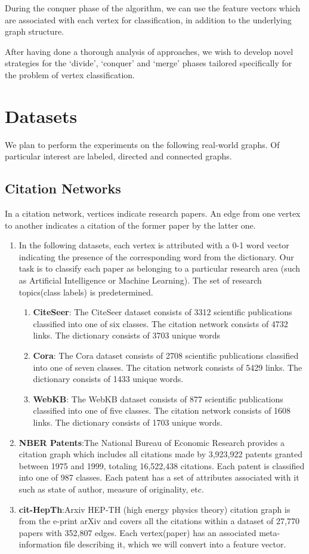 \documentclass{article}
\begin{document}
During the conquer phase of the algorithm, we can use the feature vectors which are associated with each vertex for classification, in addition to the underlying graph structure.

After having done a thorough analysis of approaches, we wish to develop novel strategies for the ‘divide’, ‘conquer’ and ‘merge’ phases tailored specifically for the problem of vertex classification.  

\section*{Datasets}
We plan to perform the experiments on the following real-world graphs. Of particular interest are labeled, directed and connected graphs.

\subsection*{Citation Networks}
 In a citation network, vertices indicate research papers. An edge from one vertex to another indicates a citation of the former paper by the latter one.

\begin{enumerate}
\item In the following datasets, each vertex is attributed with a 0-1 word vector indicating the presence of the corresponding word from the dictionary. Our task is to classify each paper as belonging to a particular research area (such as Artificial Intelligence or Machine Learning). The set of research topics(class labels) is predetermined.
\begin{enumerate}
\item \textbf{CiteSeer}: The CiteSeer dataset consists of 3312 scientific publications classified into one of six classes. The citation network consists of 4732 links. The dictionary consists of 3703 unique words
\item \textbf {Cora}: The Cora dataset consists of 2708 scientific publications classified into one of seven classes. The citation network consists of 5429 links. The dictionary consists of 1433 unique words. 
\item \textbf{WebKB}: The WebKB dataset consists of 877 scientific publications classified into one of five classes. The citation network consists of 1608 links. The dictionary consists of 1703 unique words.
\end{enumerate}
\item \textbf{NBER Patents}:The National Bureau of Economic Research provides a citation graph which includes all citations made by 3,923,922 patents granted between 1975 and 1999, totaling 16,522,438 citations. Each patent is classified into one of 987 classes. Each patent has a set of attributes associated with it such as state of author, measure of originality, etc.
\item \textbf{cit-HepTh}:Arxiv HEP-TH (high energy physics theory) citation graph is from the e-print arXiv and covers all the citations within a dataset of 27,770 papers with 352,807 edges. Each vertex(paper) has an associated meta-information file describing it, which we will convert into a feature vector.
\end{enumerate}   
\end{document}
